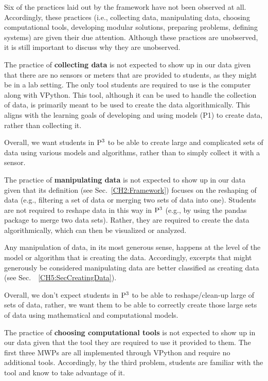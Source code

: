 \documentclass{msuphddissertation}
\begin{document}
\begin{doublespace}
Six of the practices laid out by the framework have not been observed at all.  Accordingly, these practices (i.e., collecting data, manipulating data, choosing computational tools, developing modular solutions, preparing problems, defining systems) are given their due attention.  Although these practices are unobserved, it is still important to discuss why they are unobserved.

The practice of \textbf{collecting data} is not expected to show up in our data given that there are no sensors or meters that are provided to students, as they might be in a lab setting.  The only tool students are required to use is the computer along with VPython.  This tool, although it can be used to handle the collection of data, is primarily meant to be used to create the data algorithmically.  This aligns with the learning goals of developing and using models (P1) to create data, rather than collecting it.

Overall, we want students in ${\rm P}^{3}$ to be able to create large and complicated sets of data using various models and algorithms, rather than to simply collect it with a sensor.

The practice of \textbf{manipulating data} is not expected to show up in our data given that its definition (see Sec.~\ref{CH2:Framework}) focuses on the reshaping of data (e.g., filtering a set of data or merging two sets of data into one).  Students are not required to reshape data in this way in ${\rm P}^{3}$ (e.g., by using the pandas package to merge two data sets).  Rather, they are required to create the data algorithmically, which can then be visualized or analyzed.

Any manipulation of data, in its most generous sense, happens at the level of the model or algorithm that is creating the data.  Accordingly, excerpts that might generously be considered manipulating data are better classified as creating data (see Sec.~~\ref{CH5:SecCreatingData}).

Overall, we don't expect students in ${\rm P}^{3}$ to be able to reshape/clean-up large of sets of data, rather, we want them to be able to correctly create those large sets of data using mathematical and computational models.

The practice of \textbf{choosing computational tools} is not expected to show up in our data given that the tool they are required to use it provided to them.  The first three MWPs are all implemented through VPython and require no additional tools.  Accordingly, by the third problem, students are familiar with the tool and know to take advantage of it.


\end{doublespace}
\end{document}
